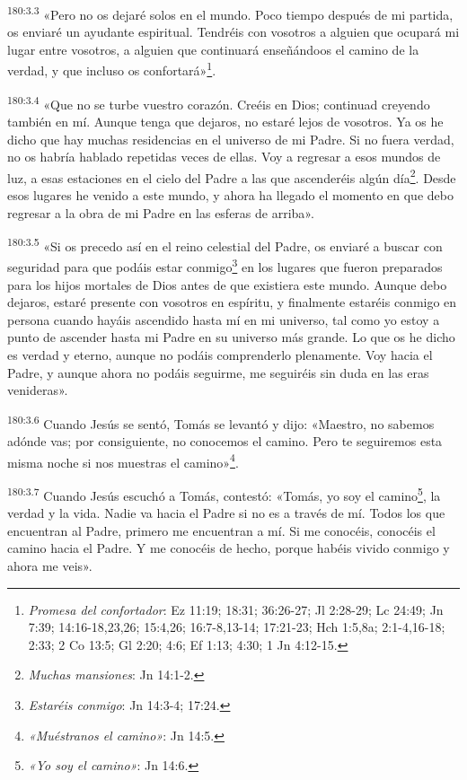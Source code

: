 \par 
\textsuperscript{180:3.3} «Pero no os dejaré solos en el mundo. Poco tiempo después de mi partida, os enviaré un ayudante espiritual. Tendréis con vosotros a alguien que ocupará mi lugar entre vosotros, a alguien que continuará enseñándoos el camino de la verdad, y que incluso os confortará»\footnote{\textit{Promesa del confortador}: Ez 11:19; 18:31; 36:26-27; Jl 2:28-29; Lc 24:49; Jn 7:39; 14:16-18,23,26; 15:4,26; 16:7-8,13-14; 17:21-23; Hch 1:5,8a; 2:1-4,16-18; 2:33; 2 Co 13:5; Gl 2:20; 4:6; Ef 1:13; 4:30; 1 Jn 4:12-15.}.

\par 
\textsuperscript{180:3.4} «Que no se turbe vuestro corazón. Creéis en Dios; continuad creyendo también en mí. Aunque tenga que dejaros, no estaré lejos de vosotros. Ya os he dicho que hay muchas residencias en el universo de mi Padre. Si no fuera verdad, no os habría hablado repetidas veces de ellas. Voy a regresar a esos mundos de luz, a esas estaciones en el cielo del Padre a las que ascenderéis algún día\footnote{\textit{Muchas mansiones}: Jn 14:1-2.}. Desde esos lugares he venido a este mundo, y ahora ha llegado el momento en que debo regresar a la obra de mi Padre en las esferas de arriba».

\par 
\textsuperscript{180:3.5} «Si os precedo así en el reino celestial del Padre, os enviaré a buscar con seguridad para que podáis estar conmigo\footnote{\textit{Estaréis conmigo}: Jn 14:3-4; 17:24.} en los lugares que fueron preparados para los hijos mortales de Dios antes de que existiera este mundo. Aunque debo dejaros, estaré presente con vosotros en espíritu, y finalmente estaréis conmigo en persona cuando hayáis ascendido hasta mí en mi universo, tal como yo estoy a punto de ascender hasta mi Padre en su universo más grande. Lo que os he dicho es verdad y eterno, aunque no podáis comprenderlo plenamente. Voy hacia el Padre, y aunque ahora no podáis seguirme, me seguiréis sin duda en las eras venideras».

\par 
\textsuperscript{180:3.6} Cuando Jesús se sentó, Tomás se levantó y dijo: «Maestro, no sabemos adónde vas; por consiguiente, no conocemos el camino. Pero te seguiremos esta misma noche si nos muestras el camino»\footnote{\textit{«Muéstranos el camino»}: Jn 14:5.}.

\par 
\textsuperscript{180:3.7} Cuando Jesús escuchó a Tomás, contestó: «Tomás, yo soy el camino\footnote{\textit{«Yo soy el camino»}: Jn 14:6.}, la verdad y la vida. Nadie va hacia el Padre si no es a través de mí. Todos los que encuentran al Padre, primero me encuentran a mí. Si me conocéis, conocéis el camino hacia el Padre. Y me conocéis de hecho, porque habéis vivido conmigo y ahora me veis».

